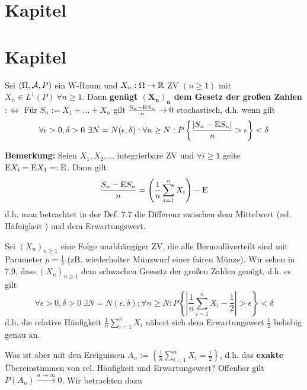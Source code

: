 \documentclass[parskip = full, 12pt]{scrartcl}
\begin{document}
\section{Kapitel}
\section{Kapitel}

\label{ss: Defintion 7.7}
	Sei $(\Omega, \mathcal{A}, P)$ ein W-Raum und $X_n: \Omega \rightarrow \mathbb{R} $ ZV 
	$(n \geq 1)$ mit $X_n \in L^1(P)\ \forall n \geq 1$. Dann \textbf{genügt 
	$\bm{{(X_n)}_n}$ dem Gesetz der großen Zahlen} 
	$:\Longleftrightarrow$ Für $S_n := X_1 + ... + X_n$ gilt $\frac{S_n - \textrm{E} S_n}
	{n} \rightarrow 0$ stochastisch, d.h. wenn gilt
	$$\forall \epsilon > 0, \delta > 0\ \exists N = N(\epsilon, \delta): \forall
	n \geq N: {P\left\{ \frac{|S_n - \textrm{E} S_n|}{n} > \epsilon \right\} < \delta}$$

	\textbf{Bemerkung:} Seien $X_1, X_2, ...$ integrierbare ZV und $\forall i 
		\geq 1$ gelte $\textrm{E} X_i = \textrm{E} X_1 =: \textrm{E}$. Dann gilt 
		$$\frac{S_n - \textrm{E} S_n}{n} =\left( \frac{1}{n} \sum_{i=1}^n X_i\right) - \textrm{E}$$
		d.h. man betrachtet in der Def. 7.7 die Differenz zwischen dem Mittelwert 
		(\glqq rel. Häfuigkeit \grqq) und dem Erwartungswert.

\label{ss: Beispiel 7.8}
	Sei ${(X_n)}_{n \geq1}$ eine Folge unabhängiger ZV, die alle Bernoulliverteilt
	sind mit Parameter $p = \frac{1}{2}$ (zB. wiederholter Münzwurf einer fairen
	Münze). Wir sehen in 7.9, dass ${(X_n)}_{n \geq 1}$ dem schwachen Geesetz der
	großen Zahlen genügt, d.h. es gilt 
	$$ \forall \epsilon > 0, \delta > 0\ \exists N = N(\epsilon, \delta): \forall
	n \geq N: P\left\{ \left| \frac{1}{n} \sum_{i=1}^n X_i - \frac{1}{2}  
	\right| > \epsilon \right\} < \delta$$
	d.h. die relative Häufigkeit $\frac{1}{n} \sum_{i=1}^n X_i$ nähert sich dem 
	Erwartungswert $\frac{1}{2}$ beliebig genau an.

	Was ist aber mit den Ereignissen $A_n := \left\{ \frac{1}{n} \sum_{i=1}^n X_i 
	= \frac{1}{2} \right \}$, d.h. das \textbf{exakte} Übereinstimmen von rel. 
	Häufigkeit und Erwartungswert? Offenbar gilt $P(A_n) \mathop{\longrightarrow}
	\limits^{n \rightarrow \infty} 0$. Wir betrachten dazu 
\end{document}
